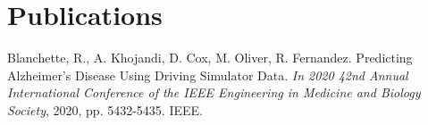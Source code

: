 \documentclass[]{plushcv}
\begin{document}
\begin{minipage}[t]{1.0\textwidth}

\section{Publications}

Blanchette, R., A. Khojandi, D. Cox, M. Oliver, R. Fernandez. Predicting Alzheimer’s
Disease Using Driving Simulator Data. \textit{In 2020 42nd Annual International Conference of
the IEEE Engineering in Medicine and Biology Society}, 2020, pp. 5432-5435. IEEE.

\sectionsep

\end{minipage}
\end{document}
